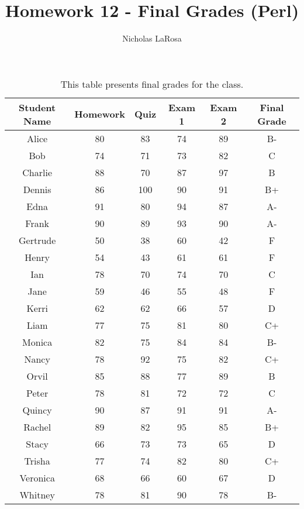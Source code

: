 \documentclass{article}
\title{Homework 12 - Final Grades (Perl)}
\author{Nicholas LaRosa}
\begin{document}
\maketitle
\begin{table}[!htb]
	\centering
	\begin{tabular}{ | c | c | c | c | c | c | }
	\hline
	\textbf{Student Name} & \textbf{Homework} & \textbf{Quiz} & \textbf{Exam 1} & \textbf{Exam 2} & \textbf{Final Grade} \\ \hline
	Alice & 80 & 83 & 74 & 89 & B- \\
\hline
	Bob & 74 & 71 & 73 & 82 & C \\
\hline
	Charlie & 88 & 70 & 87 & 97 & B \\
\hline
	Dennis & 86 & 100 & 90 & 91 & B+ \\
\hline
	Edna & 91 & 80 & 94 & 87 & A- \\
\hline
	Frank & 90 & 89 & 93 & 90 & A- \\
\hline
	Gertrude & 50 & 38 & 60 & 42 & F \\
\hline
	Henry & 54 & 43 & 61 & 61 & F \\
\hline
	Ian & 78 & 70 & 74 & 70 & C \\
\hline
	Jane & 59 & 46 & 55 & 48 & F \\
\hline
	Kerri & 62 & 62 & 66 & 57 & D \\
\hline
	Liam & 77 & 75 & 81 & 80 & C+ \\
\hline
	Monica & 82 & 75 & 84 & 84 & B- \\
\hline
	Nancy & 78 & 92 & 75 & 82 & C+ \\
\hline
	Orvil & 85 & 88 & 77 & 89 & B \\
\hline
	Peter & 78 & 81 & 72 & 72 & C \\
\hline
	Quincy & 90 & 87 & 91 & 91 & A- \\
\hline
	Rachel & 89 & 82 & 95 & 85 & B+ \\
\hline
	Stacy & 66 & 73 & 73 & 65 & D \\
\hline
	Trisha & 77 & 74 & 82 & 80 & C+ \\
\hline
	Veronica & 68 & 66 & 60 & 67 & D \\
\hline
	Whitney & 78 & 81 & 90 & 78 & B- \\
\hline
	\end{tabular}
	\caption{This table presents final grades for the class.}
\end{table}
\end{document}
